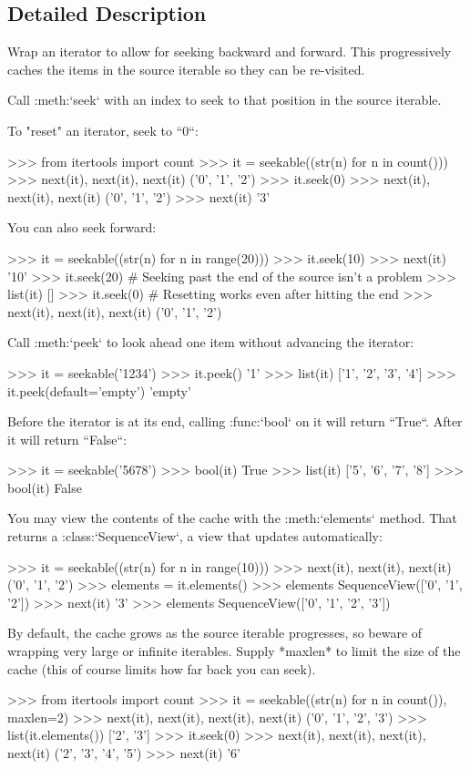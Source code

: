 \subsection{Detailed Description}
\begin{DoxyVerb}Wrap an iterator to allow for seeking backward and forward. This
progressively caches the items in the source iterable so they can be
re-visited.

Call :meth:`seek` with an index to seek to that position in the source
iterable.

To "reset" an iterator, seek to ``0``:

    >>> from itertools import count
    >>> it = seekable((str(n) for n in count()))
    >>> next(it), next(it), next(it)
    ('0', '1', '2')
    >>> it.seek(0)
    >>> next(it), next(it), next(it)
    ('0', '1', '2')
    >>> next(it)
    '3'

You can also seek forward:

    >>> it = seekable((str(n) for n in range(20)))
    >>> it.seek(10)
    >>> next(it)
    '10'
    >>> it.seek(20)  # Seeking past the end of the source isn't a problem
    >>> list(it)
    []
    >>> it.seek(0)  # Resetting works even after hitting the end
    >>> next(it), next(it), next(it)
    ('0', '1', '2')

Call :meth:`peek` to look ahead one item without advancing the iterator:

    >>> it = seekable('1234')
    >>> it.peek()
    '1'
    >>> list(it)
    ['1', '2', '3', '4']
    >>> it.peek(default='empty')
    'empty'

Before the iterator is at its end, calling :func:`bool` on it will return
``True``. After it will return ``False``:

    >>> it = seekable('5678')
    >>> bool(it)
    True
    >>> list(it)
    ['5', '6', '7', '8']
    >>> bool(it)
    False

You may view the contents of the cache with the :meth:`elements` method.
That returns a :class:`SequenceView`, a view that updates automatically:

    >>> it = seekable((str(n) for n in range(10)))
    >>> next(it), next(it), next(it)
    ('0', '1', '2')
    >>> elements = it.elements()
    >>> elements
    SequenceView(['0', '1', '2'])
    >>> next(it)
    '3'
    >>> elements
    SequenceView(['0', '1', '2', '3'])

By default, the cache grows as the source iterable progresses, so beware of
wrapping very large or infinite iterables. Supply *maxlen* to limit the
size of the cache (this of course limits how far back you can seek).

    >>> from itertools import count
    >>> it = seekable((str(n) for n in count()), maxlen=2)
    >>> next(it), next(it), next(it), next(it)
    ('0', '1', '2', '3')
    >>> list(it.elements())
    ['2', '3']
    >>> it.seek(0)
    >>> next(it), next(it), next(it), next(it)
    ('2', '3', '4', '5')
    >>> next(it)
    '6'\end{DoxyVerb}
 

